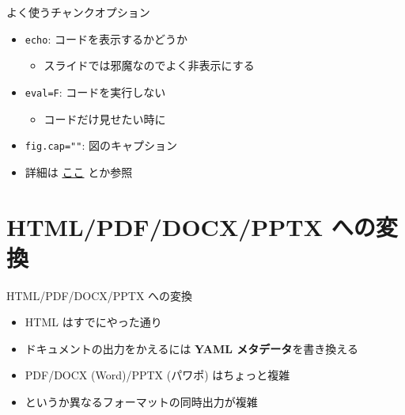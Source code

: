 \documentclass[
  ignorenonframetext,
]{beamer}
\providecommand{\tightlist}{%
  \setlength{\itemsep}{0pt}\setlength{\parskip}{0pt}}
\begin{document}
\begin{frame}[fragile]{よく使うチャンクオプション}
\protect\hypertarget{ux3088ux304fux4f7fux3046ux30c1ux30e3ux30f3ux30afux30aaux30d7ux30b7ux30e7ux30f3}{}
\begin{itemize}
\item
  \texttt{echo}: コードを表示するかどうか

  \begin{itemize}
  \tightlist
  \item
    スライドでは邪魔なのでよく非表示にする
  \end{itemize}
\item
  \texttt{eval=F}: コードを実行しない

  \begin{itemize}
  \tightlist
  \item
    コードだけ見せたい時に
  \end{itemize}
\item
  \texttt{fig.cap=""}: 図のキャプション
\item
  詳細は \href{https://gedevan-aleksizde.github.io/knitr-doc-ja/index.html}{ここ} とか参照
\end{itemize}
\end{frame}

\hypertarget{htmlpdfdocxpptx-ux3078ux306eux5909ux63db}{%
\section{HTML/PDF/DOCX/PPTX への変換}\label{htmlpdfdocxpptx-ux3078ux306eux5909ux63db}}

\begin{frame}{HTML/PDF/DOCX/PPTX への変換}
\begin{itemize}
\tightlist
\item
  HTML はすでにやった通り
\item
  ドキュメントの出力をかえるには \textbf{YAML メタデータ}を書き換える
\item
  PDF/DOCX (Word)/PPTX (パワポ) はちょっと複雑
\item
  というか異なるフォーマットの同時出力が複雑
\end{itemize}
\end{frame}
\end{document}
